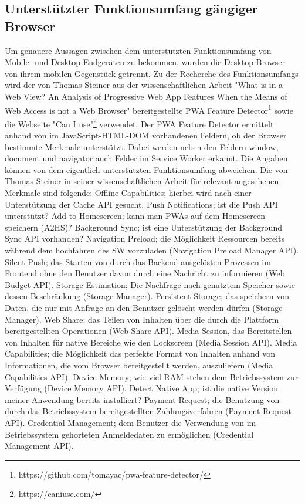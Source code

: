 \subsection{Unterstützter Funktionsumfang gängiger Browser}
\label{subsec:unterstuetzterfunktionsumfanggaengigerbrowser}
Um genauere Aussagen zwischen dem unterstützten Funktionsumfang von Mobile-
und Desktop-Endgeräten zu bekommen, wurden die Desktop-Browser von ihrem mobilen
Gegenstück getrennt. Zu der Recherche des Funktionsumfangs wird
der von Thomas Steiner aus der wissenschaftlichen Arbeit "What is
in a Web View? An Analysis of Progressive Web App Features When the
Means of Web Access is not a Web Browser" bereitgestellte
PWA Feature Detector\footnote{https://github.com/tomayac/pwa-feature-detector/} sowie 
die Webseite "Can I use"\footnote{https://caniuse.com/} verwendet.
Der PWA Feature Detector ermittelt anhand von im JavaScript-HTML-DOM
vorhandenen Feldern, ob der Browser bestimmte Merkmale unterstützt.
Dabei werden neben den Feldern window, document und navigator
auch Felder im Service Worker erkannt. Die Angaben können von dem
eigentlich unterstützten Funktionsumfang abweichen. Die von Thomas
Steiner in seiner wissenschaftlichen Arbeit für relevant angesehenen
Merkmale sind folgende: Offline Capabilities; hierbei wird nach
einer Unterstützung der Cache API gesucht. Push Notifications;
ist die Push API unterstützt? Add to Homescreen; kann man PWAs auf
dem Homescreen speichern (A2HS)? Background Sync; ist eine Unterstützung
der Background Sync API vorhanden? Navigation Preload; die Möglichkeit
Ressourcen bereits während dem hochfahren des SW vorzuladen
(Navigation Preload Manager API). Silent Push; das Starten von durch das
Backend ausgelösten Prozessen im Frontend ohne den Benutzer
davon durch eine Nachricht zu informieren (Web Budget API). 
Storage Estimation; Die Nachfrage nach genutztem Speicher sowie
dessen Beschränkung (Storage Manager). Persistent Storage;
das speichern von Daten, die nur mit Anfrage an den Benutzer gelöscht
werden dürfen (Storage Manager). Web Share; das Teilen von Inhalten
über die durch die Plattform bereitgestellten Operationen (Web Share API).
Media Session, das Bereitstellen von Inhalten für native
Bereiche wie den Lockscreen (Media Session API). Media Capabilities;
die Möglichkeit das perfekte Format von Inhalten anhand von
Informationen, die vom Browser bereitgestellt werden, auszuliefern (Media Capabilities API).
Device Memory; wie viel RAM stehen dem Betriebssystem zur
Verfügung (Device Memory API). Detect Native App; ist die native Version
meiner Anwendung bereits installiert? Payment Request;
die Benutzung von durch das Betriebssystem bereitgestellten
Zahlungsverfahren (Payment Request API). Credential Management;
dem Benutzer die Verwendung von im Betriebssystem gehorteten
Anmeldedaten zu ermöglichen (Credential Management API).\cite[Abschnitt 2.3]{WhatIsInAWebView}

